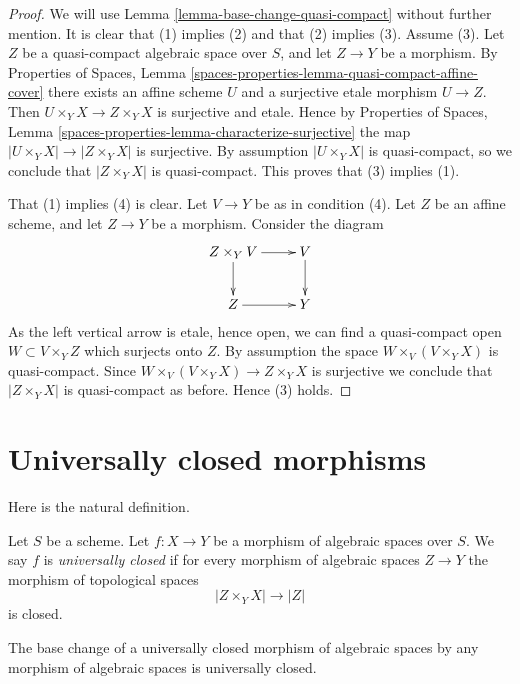 \begin{proof}
We will use Lemma \ref{lemma-base-change-quasi-compact}
without further mention.
It is clear that (1) implies (2) and that (2) implies (3).
Assume (3). Let $Z$ be a quasi-compact algebraic space over $S$,
and let $Z \to Y$ be a morphism. By
Properties of Spaces, Lemma
\ref{spaces-properties-lemma-quasi-compact-affine-cover}
there exists an affine scheme $U$ and a surjective etale morphism
$U \to Z$. Then $U \times_Y X \to Z \times_Y X$ is surjective and
etale. Hence by
Properties of Spaces, Lemma
\ref{spaces-properties-lemma-characterize-surjective}
the map $|U \times_Y X| \to |Z \times_Y X|$ is surjective.
By assumption $|U \times_Y X|$ is quasi-compact, so
we conclude that $|Z \times_Y X|$ is quasi-compact.
This proves that (3) implies (1).

\medskip\noindent
That (1) implies (4) is clear. Let $V \to Y$ be as in
condition (4). Let $Z$ be an
affine scheme, and let $Z \to Y$ be a morphism. Consider the diagram
$$
\xymatrix{
Z \times_Y V \ar[r] \ar[d] & V \ar[d] \\
Z \ar[r] & Y
}
$$
As the left vertical arrow is etale, hence open,
we can find a quasi-compact open $W \subset V \times_Y Z$ which
surjects onto $Z$. By assumption the space $W \times_V (V \times_Y X)$
is quasi-compact. Since $W \times_V (V \times_Y X) \to Z \times_Y X$
is surjective we conclude that $|Z \times_Y X|$ is quasi-compact as
before. Hence (3) holds.
\end{proof}




\section{Universally closed morphisms}
\label{section-universally-closed}

\noindent
Here is the natural definition.

\begin{definition}
\label{definition-universally-closed}
Let $S$ be a scheme. Let $f : X \to Y$ be a morphism of algebraic spaces
over $S$. We say $f$ is {\it universally closed} if for every morphism
of algebraic spaces $Z \to Y$ the morphism of topological spaces
$$
|Z \times_Y X| \to |Z|
$$
is closed.
\end{definition}

\begin{lemma}
\label{lemma-base-change-universally-closed}
The base change of a universally closed morphism of algebraic spaces
by any morphism of algebraic spaces is universally closed.
\end{lemma}

